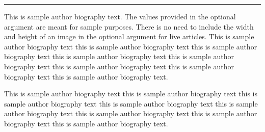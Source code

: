 \documentclass[unnumsec,webpdf,modern,large]{oup-authoring-template}
\theoremstyle{thmstyleone}%
\theoremstyle{thmstyletwo}%
\theoremstyle{thmstylethree}%
\begin{document}
\begin{biography}{{\color{black!20}\rule{77pt}{57pt}}}{\author{Author Name.} This is sample author biography text. The values provided in the optional argument are meant for sample purposes. There is no need to include the width and height of an image in the optional argument for live articles. This is sample author biography text this is sample author biography text this is sample author biography text this is sample author biography text this is sample author biography text this is sample author biography text this is sample author biography text this is sample author biography text.}
\end{biography}

\begin{biography}{}{\author{Author Name.} This is sample author biography text this is sample author biography text this is sample author biography text this is sample author biography text this is sample author biography text this is sample author biography text this is sample author biography text this is sample author biography text.}
\end{biography}

\end{document}

